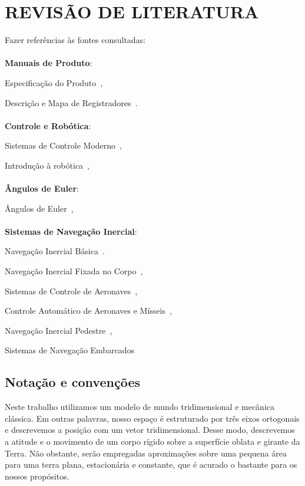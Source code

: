\chapter{REVISÃO DE LITERATURA}\label{chap:fundamentacaoTeorica}

Fazer referências às fontes consultadas:
\\

\\
\textbf{Manuais de Produto}:

Especificação do Produto~\cite{mpu6050ps},

Descrição e Mapa de Registradores~\cite{mpu6050rm}.
\\

\\
\textbf{Controle e Robótica}:

Sistemas de Controle Moderno~\cite{Ogata2010},

Introdução à robótica~\cite{Craig2014},
\\

\\
\textbf{Ângulos de Euler}:

Ângulos de Euler~\cite{Henderson1997},
\\

\\
\textbf{Sistemas de Navegação Inercial}:

Navegação Inercial Básica~\cite{Stovall1997}.

Navegação Inercial Fixada no Corpo~\cite{Weston2004},

Sistemas de Controle de Aeronaves~\cite{Stevens2016},

Controle Automático de Aeronaves e Mísseis~\cite{Blakelock1991},

Navegação Inercial Pedestre~\cite{Wang2021},

Sistemas de Navegação Embarcados~\cite{Haoran2019}

\section{Notação e convenções}

Neste trabalho utilizamos um modelo de mundo tridimensional e mecânica
clássica. Em outras palavras, nosso espaço é estruturado por três eixos
ortogonais e descrevemos a posição com um vetor tridimensional. Desse modo,
descrevemos a atitude e o movimento de um corpo rígido sobre a superfície
oblata e girante da Terra. Não obstante, serão empregadas aproximações sobre
uma pequena área para uma terra plana, estacionária e constante, que é acurado
o bastante para os nossos propósitos.

